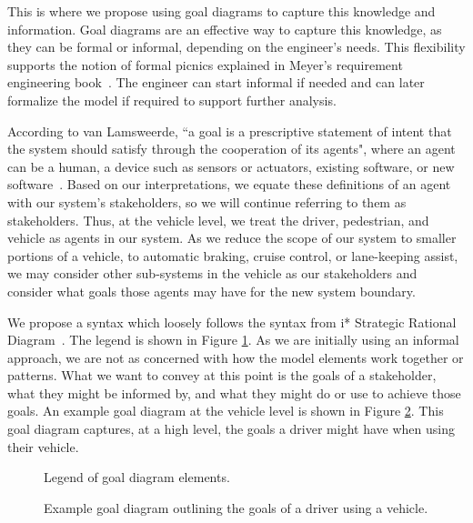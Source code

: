 This is where we propose using goal diagrams to capture this knowledge and information. Goal diagrams are an effective way to capture this knowledge, as they can be formal or informal, depending on the engineer's needs. This flexibility supports the notion of formal picnics explained in Meyer's requirement engineering book~\cite{meyer2022handbook}. The engineer can start informal if needed and can later formalize the model if required to support further analysis. 

According to van Lamsweerde, ``a goal is a prescriptive statement of intent that the system should satisfy through the cooperation of its agents", where an agent can be a human, a device such as sensors or actuators, existing software, or new software~\cite{lamsweerde2009requirements}. Based on our interpretations, we equate these definitions of an agent with our system's stakeholders, so we will continue referring to them as stakeholders. Thus, at the vehicle level, we treat the driver, pedestrian, and vehicle as agents in our system. As we reduce the scope of our system to smaller portions of a vehicle, to automatic braking, cruise control, or lane-keeping assist, we may consider other sub-systems in the vehicle as our stakeholders and consider what goals those agents may have for the new system boundary.

We propose a syntax which loosely follows the syntax from i* Strategic Rational Diagram~\cite{wautelet2016building, lopez2012specialization}. The legend is shown in Figure \ref{fig:legend}. As we are initially using an informal approach, we are not as concerned with how the model elements work together or patterns. What we want to convey at this point is the goals of a stakeholder, what they might be informed by, and what they might do or use to achieve those goals. An example goal diagram at the vehicle level is shown in Figure \ref{fig:goal_diagram_example}. This goal diagram captures, at a high level, the goals a driver might have when using their vehicle. 

\begin{figure}
	\centering
	
	\caption{Legend of goal diagram elements.}
	\label{fig:legend}
\end{figure}

\begin{figure}
	\centering
	
	\caption{Example goal diagram outlining the goals of a driver using a vehicle.}
	\label{fig:goal_diagram_example}
\end{figure}

